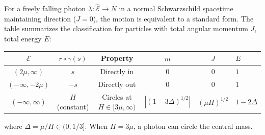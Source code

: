 For a freely falling photon $\lambda: \hat{\mathcal{E}} \to N$ in a normal Schwarzschild spacetime maintaining direction ($J = 0$), the motion is equivalent to a standard form. The table summarizes the classification for particles with total angular momentum $J$, total energy $E$:

\begin{center}
\begin{tabular}{c|c|c|c|c}
$\mathcal{E}$ & $r \circ \gamma(s)$ & Property & $m$ & $J$ & $E$ \\
\hline
$(2\mu, \infty)$ & $s$ & Directly in & $0$ & $0$ & $1$ \\
$(-\infty, -2\mu)$ & $-s$ & Directly out & $0$ & $0$ & $1$ \\
$(-\infty, \infty)$ & $H$ (constant) & Circles at $H \in [3\mu, \infty)$ & $|(1-3\Delta)^{1/2}|$ & $(\mu H)^{1/2}$ & $1-2\Delta$
\end{tabular}
\end{center}
where $\Delta = \mu/H \in (0, 1/3]$. When $H = 3\mu$, a photon can circle the central mass.
